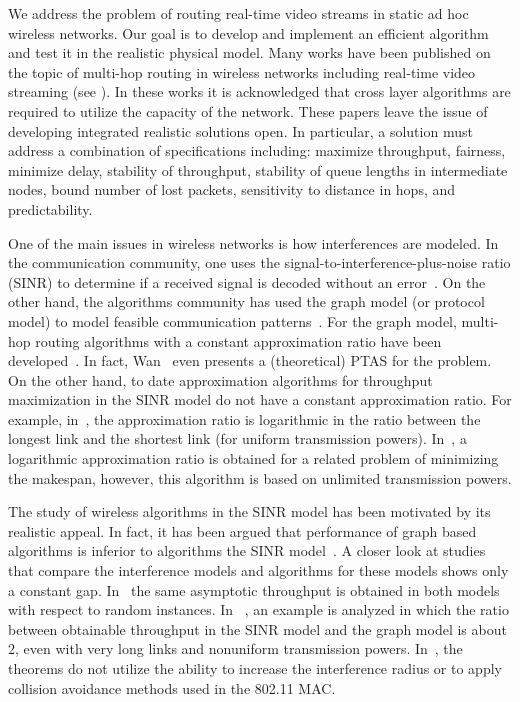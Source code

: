 \documentclass[12pt,oneside,english,a4paper]{book}
\theoremstyle{plain}
\theoremstyle{definition}
\theoremstyle{Theorem}
\theoremstyle{plain}
\newenvironment{proof sketch}[1]{\noindent {\emph{Proof sketch of #1:}}}{\hfill \qed}
\begin{document}

We address the problem of routing real-time video streams in static ad
hoc wireless networks.  Our goal is to develop and implement an
efficient algorithm and test it in the realistic physical model.  Many
works have been published on the topic of multi-hop routing in
wireless networks including real-time video streaming (see
\cite{setton2005cross,khan2006application,shan2005cross,van2005cross}).
In these works it is acknowledged that cross layer algorithms are
required to utilize the capacity of the network.  These papers leave
the issue of developing integrated realistic solutions open. In
particular, a solution must address a combination of specifications
including: maximize throughput, fairness, minimize delay, stability of
throughput, stability of queue lengths in intermediate nodes, bound number of lost
packets, sensitivity to distance in hops, and predictability.

One of the main issues in wireless networks is how interferences are
modeled. In the communication community, one uses the
signal-to-interference-plus-noise ratio (SINR) to determine if a
received signal is decoded without an
error~\cite{gallager1968information}. On the other hand, the
algorithms community has used the graph model (or protocol model) to
model feasible communication
patterns~\cite{jain2005impact,alicherry2005joint11}. For the graph
model, multi-hop routing algorithms with a constant approximation
ratio have been
developed~\cite{kumar2005algorithmic,alicherry2005joint11,buragohain2007improved,wan2009multiflows}.
In fact, Wan~\cite{wan2009multiflows} even presents a (theoretical)
PTAS for the problem. On the other hand, to date approximation algorithms for
throughput maximization in the SINR model do not have a constant
approximation ratio. For example, in~\cite{ChafekarCapacity}, the
approximation ratio is logarithmic in the ratio between the longest
link and the shortest link (for uniform transmission powers).
In~\cite{K10}, a logarithmic approximation ratio is obtained for a
related problem of minimizing the makespan, however, this algorithm is
based on unlimited transmission powers.

The study of wireless algorithms in the SINR model has been motivated
by its realistic appeal. In fact, it has been argued that performance
of graph based algorithms is inferior to algorithms the SINR
model~\cite{goussevskaia2007complexity}.  A closer look at studies
that compare the interference models and algorithms for these
models shows only a constant gap.
In~\cite{gupta2000capacity} the same asymptotic throughput is obtained
in both models with respect to random instances. In
~\cite{moscibroda2006protocol}, an example is analyzed in which the
ratio between obtainable throughput in the SINR model and the graph
model is about $2$, even with very long links and nonuniform
transmission powers. In~\cite{behzad2004performance}, the theorems do
not utilize the ability to increase the interference radius or to
apply collision avoidance methods used in the 802.11 MAC.
\end{document}
